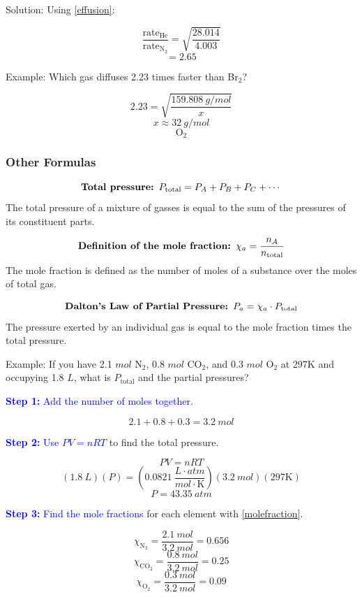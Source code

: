 \documentclass[a4paper, 12pt]{article}
\newcommand{\R}{\left(0.0821 \: \frac{L \cdot atm}{mol \cdot \text{K}}\right)}
\begin{document}
Solution: Using \ref{effusion}:

$$\frac{\text{rate}_\text{He}}{\text{rate}_\text{N$_2$}} = \sqrt{\frac{28.014}{4.003}}$$
$$=\boxed{2.65}$$

Example: Which gas diffuses 2.23 times faster than Br$_2$?

$$2.23 = \sqrt{\frac{159.808 \: g/mol}{x}}$$
$$x \approx 32 \: g/mol$$
$$\boxed{\text{O}_2}$$

\subsubsection*{Other Formulas}

\begin{equation}\label{totalpressure}
    \text{\textbf{Total pressure: }} P_{\text{total}} = P_A + P_B + P_C + \cdots
\end{equation}
The total pressure of a mixture of gasses is equal to the sum of the pressures of its constituent parts.

\begin{equation}\label{molefraction}
    \text{\textbf{Definition of the mole fraction: }} \chi_a = \frac{n_A}{n_\text{total}}
\end{equation}
The mole fraction is defined as the number of moles of a substance over the moles of total gas.

\begin{equation}\label{partialpressure}
    \text{\textbf{Dalton's Law of Partial Pressure: }} P_a = \chi_a \cdot P_{\text{total}} 
\end{equation}
The pressure exerted by an individual gas is equal to the mole fraction times the total pressure.

Example: If you have 2.1 $mol$ N$_2$, 0.8 $mol$ CO$_2$, and 0.3 $mol$ O$_2$ at 297K and occupying 1.8 $L$, what is $P_{\text{total}}$ and the partial pressures?

\textcolor{blue}{\textbf{Step 1:} Add the number of moles together.}

$$2.1 + 0.8 + 0.3 = 3.2 \: mol$$

\textcolor{blue}{\textbf{Step 2:} Use $PV = nRT$} to find the total pressure.

$$PV = nRT$$
$$(1.8 \: L)(P) = \R (3.2 \: mol)(297\text{K})$$
$$P = 43.35 \: atm$$

\textcolor{blue}{\textbf{Step 3:} Find the mole fractions} for each element with \ref{molefraction}.

$$\chi_{\text{N}_2} = \frac{2.1 \: mol}{3.2 \: mol} = 0.656$$
$$\chi_{\text{CO}_2} = \frac{0.8 \: mol}{3.2 \: mol} = 0.25$$
$$\chi_{\text{O}_2} = \frac{0.3 \: mol}{3.2 \: mol} = 0.09$$
\end{document}
